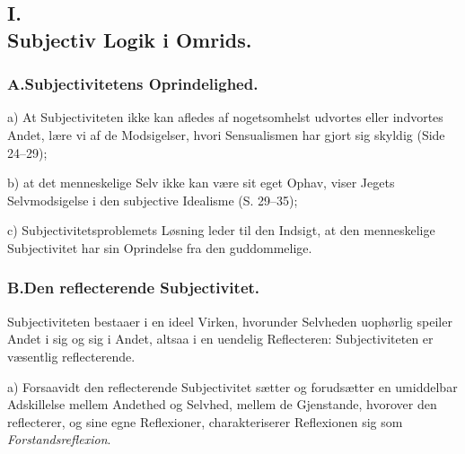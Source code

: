 \documentclass[11pt]{book}
\begin{document}
\subsection*{I.\\ Subjectiv Logik i Omrids.}

\subsubsection*{A.\quad Subjectivitetens Oprindelighed.}

a) At Subjectiviteten ikke kan afledes af nogetsomhelst udvortes eller
indvortes Andet, lære vi af de Modsigelser, hvori Sensualismen har gjort
sig skyldig (Side 24--29);\par\noindent
b) at det menneskelige Selv ikke kan være sit eget Ophav, viser Jegets
Selvmodsigelse i den subjective Idealisme (S. 29--35);\par\noindent
c) Subjectivitetsproblemets Løsning leder til den Indsigt, at den
menneskelige Subjectivitet har sin Oprindelse fra den guddommelige.

\subsubsection*{B.\quad Den reflecterende Subjectivitet.}

Subjectiviteten bestaaer i en ideel Virken, hvorunder Selvheden
uophørlig speiler Andet i sig og sig i Andet, altsaa i en uendelig
Reflecteren: Subjectiviteten er væsentlig reflecterende.

a) Forsaavidt den reflecterende Subjectivitet sætter og forudsætter en
umiddelbar Adskillelse mellem Andethed og Selvhed, mellem de Gjenstande,
hvorover den reflecterer, og sine egne Reflexioner, charakteriserer
Reflexionen sig som \emph{Forstandsreflexion}.
\end{document}
